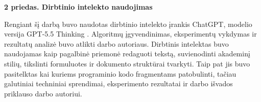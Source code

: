 \documentclass[]{VUMIFTemplateClass}
\begin{document}
\bigskip
{}
{}
\textbf{2 priedas. Dirbtinio intelekto naudojimas}

Rengiant šį darbą buvo naudotas dirbtinio intelekto įrankis ChatGPT, modelio versija GPT-5.5 Thinking \parencite{chatgpt_bendrai}. Algoritmų įgyvendinimas, eksperimentų vykdymas ir rezultatų analizė buvo atlikti darbo autoriaus. Dirbtinis
intelektas buvo naudojamas kaip pagalbinė priemonė redaguoti tekstą, suvienodinti akademinį stilių, tikslinti formuluotes ir dokumento struktūrai
tvarkyti. Taip pat jis buvo pasitelktas kai kuriems programinio kodo fragmentams patobulinti, tačiau galutiniai techniniai sprendimai,
eksperimento rezultatai ir darbo išvados priklauso darbo autoriui.
\end{document}
